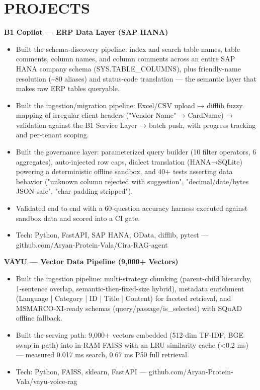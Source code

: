 \documentclass[9pt]{article}
\begin{document}
\section*{PROJECTS}
\textbf{B1 Copilot  ---  ERP Data Layer (SAP HANA)}
\vspace{1pt}
\begin{itemize}[leftmargin=11pt,itemsep=0pt,topsep=1pt,parsep=0pt]
\item Built the schema-discovery pipeline: index and search table names, table comments, column names, and column comments across an entire SAP HANA company schema (SYS.TABLE\_COLUMNS), plus friendly-name resolution (\textasciitilde{}80 aliases) and status-code translation  ---  the semantic layer that makes raw ERP tables queryable.
\item Built the ingestion/migration pipeline: Excel/CSV upload → difflib fuzzy mapping of irregular client headers ("Vendor Name" → CardName) → validation against the B1 Service Layer → batch push, with progress tracking and per-tenant scoping.
\item Built the governance layer: parameterized query builder (10 filter operators, 6 aggregates), auto-injected row caps, dialect translation (HANA→SQLite) powering a deterministic offline sandbox, and 40+ tests asserting data behavior ("unknown column rejected with suggestion", "decimal/date/bytes JSON-safe", "char padding stripped").
\item Validated end to end with a 60-question accuracy harness executed against sandbox data and scored into a CI gate.
\item Tech: Python, FastAPI, SAP HANA, OData, difflib, pytest  ---  github.com/Aryan-Protein-Vala/Cira-RAG-agent
\end{itemize}
\textbf{VĀYU  ---  Vector Data Pipeline (9,000+ Vectors)}
\vspace{1pt}
\begin{itemize}[leftmargin=11pt,itemsep=0pt,topsep=1pt,parsep=0pt]
\item Built the ingestion pipeline: multi-strategy chunking (parent-child hierarchy, 1-sentence overlap, semantic-then-fixed-size hybrid), metadata enrichment (Language | Category | ID | Title | Content) for faceted retrieval, and MSMARCO-XI-ready schemas (query/passage/is\_selected) with SQuAD offline fallback.
\item Built the serving path: 9,000+ vectors embedded (512-dim TF-IDF, BGE swap-in path) into in-RAM FAISS with an LRU similarity cache (<0.2 ms)  ---  measured 0.017 ms search, 0.67 ms P50 full retrieval.
\item Tech: Python, FAISS, sklearn, FastAPI  ---  github.com/Aryan-Protein-Vala/vayu-voice-rag
\end{itemize}
\end{document}
